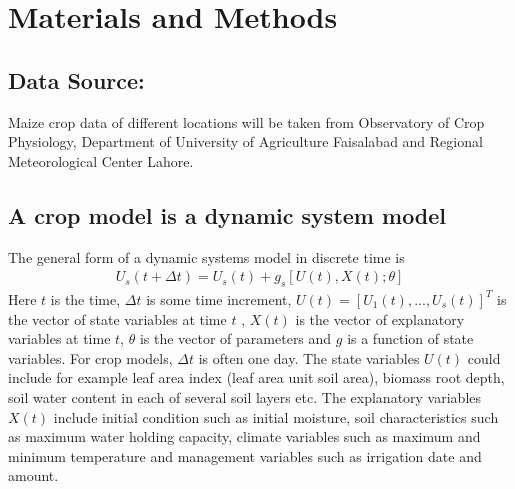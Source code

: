\section{Materials and Methods}

\subsection{Data Source:}
Maize crop data of different locations will be taken from Observatory of Crop Physiology, Department of University of Agriculture Faisalabad and Regional Meteorological Center Lahore.
\subsection{A crop model is a dynamic system model}
The general form of a dynamic systems model \citep{BrunWallachMakowskiEtAl2006} in discrete time is
\begin{eqnarray}
U_s (t+\Delta t)=U_s (t)+g_s [U(t),X(t);\theta] 
\end{eqnarray}
 Here $t$  is the time,  $\Delta$$t$  is some time increment, $U(t)=[U_1 (t),...,U_s (t)]^T$ is the vector of state variables at time $t$ , $X(t)$ is the vector of explanatory variables at time $t$, $\theta$  is the vector of parameters and $g$ is a function of   state variables. For crop models, $\Delta$$t$ is often one day. The state variables $U(t)$  could include for example leaf area index (leaf area unit soil area), biomass root depth, soil water content in each of several soil layers etc. The explanatory variables $X(t)$  include initial condition such as initial moisture, soil characteristics such as maximum water holding capacity, climate variables such as maximum and minimum temperature and management variables such as irrigation date and amount. 
